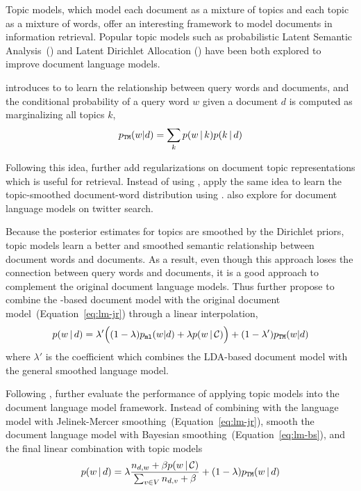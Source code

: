 Topic models, which model each document as a mixture of topics and
each topic as a mixture of words, offer an interesting framework to
model documents in information retrieval. Popular topic models such as
probabilistic Latent Semantic Analysis~() and Latent Dirichlet Allocation ()
have been both explored to improve document language models.

\citet{hofmann-99a} introduces  to
to learn the relationship between query words and documents,
and the conditional probability of a query word $w$ given a document $d$ is
computed as marginalizing all topics $k$,
\begin{align}
p_{\texttt{TM}}(w|d) = \sum_{k} p(w \, | \, k) p(k \, | \, d)
\end{align}

Following this idea, \citet{Wang-2013} further add regularizations  on document topic representations 
which is useful for retrieval. Instead of using , \citet{wei-06} apply the same idea to 
learn the topic-smoothed document-word distribution using .
\citet{Vosecky-2014} also explore  for document language models on  twitter search.

Because the posterior estimates for topics are smoothed by the Dirichlet priors, topic models learn a better and
smoothed semantic relationship between document words and documents. As a result,
even though this approach loses the connection between query words and documents,
it is a good approach to complement the original document language models. 
Thus \citet{wei-06} further propose to combine the
-based document model with the original document
model~(Equation~\ref{eq:lm-jr}) through a linear interpolation,
\begin{align}
p(w \, | \, d) = \lambda' \Big( (1 - \lambda) p_{\texttt{ml}}(w|d) + \lambda
p(w \, | \, \mathcal{C}) \Big) + (1 - \lambda') p_{\texttt{TM}}(w|d)
\end{align}
where $\lambda'$ is the coefficient which combines the LDA-based
document model with the general smoothed language model.

Following \citet{wei-06}, \citet{Lu-2011} further evaluate the
performance of applying topic models into the document language model
framework. Instead of combining with the language model with
Jelinek-Mercer smoothing~(Equation~\ref{eq:lm-jr}), \citet{Lu-2011}
smooth the document language model with Bayesian
smoothing~(Equation~\ref{eq:lm-bs}), and the final linear combination
with topic models
\begin{align}
p(w \, | \, d) = \lambda \frac{n_{d,w} + \beta p(w \, | \, \mathcal{C})}{\sum_{v
  \in V} n_{d,v} + \beta}  + (1 - \lambda) p_{\texttt{TM}}(w \, | \, d)
\end{align}

